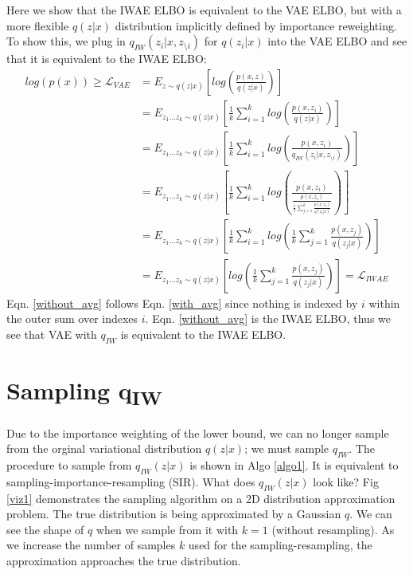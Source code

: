 \documentclass{article} %
\begin{document}
Here we show that the IWAE ELBO is equivalent to the VAE ELBO, but with a more flexible $q(z|x)$ distribution implicitly defined by importance reweighting. To show this, we plug in $q_{IW}(z_i|x,z_{\setminus i})$ for $q(z_i|x)$ into the VAE ELBO and see that it is equivalent to the IWAE ELBO:
\begin{align} 
    log(p(x)) \geq \mathcal{L}_{VAE} &= 
    E_{z \sim q(z|x)} \left[  log\left(\frac{p(x,z)}{q(z|x)} \right) \right] \\    
    &= E_{z_{1}...z_{k} \sim q(z|x)} \left[  \frac{1}{k}\sum_{i=1}^k log\left(\frac{p(x,z_i)}{q(z|x)} \right) \right] \\
    &= E_{z_{1}...z_{k} \sim q(z|x)} \left[  \frac{1}{k}\sum_{i=1}^k log\left(\frac{p(x,z_i)}{q_{IW}(z_i|x,z_{\setminus i})}  \right)  \right] \\
    &= E_{z_{1}...z_{k} \sim q(z|x)} \left[  \frac{1}{k}\sum_{i=1}^k log\left(\frac{p(x,z_i)}{\frac{p(x,z_i)}{\frac{1}{k}   \sum_{j=1}^k \frac{p(x,z_j)}{q(z_j|x)}}}  \right)  \right] \\
    &= E_{z_{1}...z_{k} \sim q(z|x)} \left[  \frac{1}{k}\sum_{i=1}^k log\left(\frac{1}{k} \sum_{j=1}^k \frac{p(x,z_j)}{q(z_j|x)}\right)  \right] \label{with_avg} \\
    &= E_{z_{1}...z_{k} \sim q(z|x)} \left[  log\left(\frac{1}{k}\sum_{j=1}^k \frac{p(x,z_j)}{q(z_j|x)}  \right)  \right] \label{without_avg} = \mathcal{L}_{IWAE}
\end{align}
Eqn. \ref{without_avg} follows Eqn. \ref{with_avg} since nothing is indexed by $i$ within the outer sum over indexes $i$. Eqn. \ref{without_avg} is the IWAE ELBO, thus we see that VAE with $q_{IW}$ is equivalent to the IWAE ELBO.












\section{Sampling q\textsubscript{IW}}
Due to the importance weighting of the lower bound, we can no longer sample from the orginal variational distribution $q(z|x)$; we must sample $q_{IW}$. The procedure to sample from $q_{IW}(z|x)$ is shown in Algo \ref{algo1}. It is equivalent to sampling-importance-resampling (SIR). What does $q_{IW}(z|x)$ look like? Fig \ref{viz1} demonstrates the sampling algorithm on a 2D distribution approximation problem. The true distribution is being approximated by a Gaussian $q$. We can see the shape of $q$ when we sample from it with $k=1$ (without resampling). As we increase the number of samples $k$ used for the sampling-resampling, the approximation approaches the true distribution.
\end{document}
